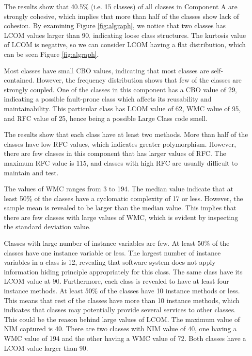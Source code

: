 The results show that 40.5\% (i.e. 15 classes) of all classes in Component A are strongly cohesive, which implies that more than half of the classes show lack of cohesion. By examining Figure \ref{fig:algraph}, we notice that two classes has LCOM values larger than 90, indicating loose class structures. The kurtosis value of LCOM is negative, so we can consider LCOM having a flat distribution, which can be seen Figure \ref{fig:algraph}. 

Most classes have small CBO values, indicating that most classes are self-contained. However, the frequency distribution shows that few of the classes are strongly coupled. One of the classes in this component has a CBO value of 29, indicating a possible fault-prone class which affects its reusability and maintainability. This particular class has LCOM value of 62, WMC value of 95, and RFC value of 25, hence being a possible Large Class code smell.

The results show that each class have at least two methods. More than half of the classes have low RFC values, which indicates greater polymorphism. However, there are few classes in this component that has larger values of RFC. The maximum RFC value is 115, and classes with high RFC are usually difficult to maintain and test. 

The values of WMC ranges from 3 to 194. The median value indicate that at least 50\% of the classes have a cyclomatic complexity of 17 or less. However, the sample mean is revealed to be larger than the median value. This implies that there are few classes with large values of WMC, which is evident by inspecting the standard deviation value.

Classes with large number of instance variables are few. At least 50\% of the classes have one instance variable or less. The largest number of instance variables in a class is 12, revealing that software system does not apply information hiding principle appropriately for this class. The same class have its LCOM value at 90. Furthermore, each class is revealed to have at least four instance methods. At least 50\% of the classes have 10 instance methods or less. This means that rest of the classes have more than 10 instance methods, which indicates that classes may potentially provide several services to other classes. This could be the reason behind large values of LCOM. The maximum value of NIM captured is 40. There are two classes with NIM value of 40, one having a WMC value of 194 and the other having a WMC value of 72. Both classes have a LCOM value larger than 90.


